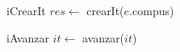 \begin{Algoritmos}
  \begin{algoritmo}{iCrearIt}{}{}
  $res \gets$ crearIt($e$.compus)
  \end{algoritmo}
   
  \begin{algoritmo}{iAvanzar}{}
  $it \gets$ avanzar($it$)
  \end{algoritmo}
   

\end{Algoritmos}










